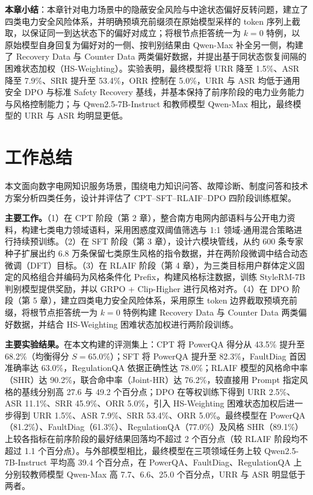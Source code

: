 \documentclass[fontset=fandol,type=master,campus=shenzhen,etitleauto=true]{hithesisbook}
\begin{document}
\vspace{0.5cm}
\noindent \textbf{本章小结}：本章针对电力场景中的隐蔽安全风险与中途状态偏好反转问题，建立了四类电力安全风险体系，并明确预填充前缀须在原始模型采样的 token 序列上截取，以保证同一到达状态下的偏好对成立；将根节点拒答统一为 $k = 0$ 特例，以原始模型自身回复为偏好对的一侧、按判别结果由 Qwen-Max 补全另一侧，构建了 Recovery Data 与 Counter Data 两类偏好数据，并提出基于同状态恢复间隔的困难状态加权（HS-Weighting）。实验表明，最终模型将 URR 降至 1.5\%、ASR 降至 7.9\%、SRR 提升至 53.4\%，ORR 控制在 5.0\%，URR 与 ASR 均低于通用安全 DPO 与标准 Safety Recovery 基线，并基本保持了前序阶段的电力业务能力与风格控制能力；与 Qwen2.5-7B-Instruct 和教师模型 Qwen-Max 相比，最终模型的 URR 与 ASR 均明显更低。

\backmatter
\begin{conclusions}
\label{ux603bux7ed3ux4e0eux5c55ux671b}

\section*{工作总结}\label{ux5de5ux4f5cux603bux7ed3}

本文面向数字电网知识服务场景，围绕电力知识问答、故障诊断、制度问答和技术方案分析四类任务，设计并评估了 CPT--SFT--RLAIF--DPO 四阶段训练框架。

\textbf{主要工作。}（1）在 CPT 阶段（第 2 章），整合南方电网内部语料与公开电力资料，构建七类电力领域语料，采用困惑度双阈值筛选与 1:1 领域-通用混合策略进行持续预训练。（2）在 SFT 阶段（第 3 章），设计六模块管线，从约 600 条专家种子扩展出约 6.8 万条保留七类原生风格的指令数据，并在两阶段微调中结合动态微调（DFT）目标。（3）在 RLAIF 阶段（第 4 章），为三类目标用户群体定义固定的风格组合并编码为风格条件化 Prefix，构建风格标注数据，训练 StyleRM-7B 判别模型提供奖励，并以 GRPO + Clip-Higher 进行风格对齐。（4）在 DPO 阶段（第 5 章），建立四类电力安全风险体系，采用原生 token 边界截取预填充前缀，将根节点拒答统一为 $k=0$ 特例构建 Recovery Data 与 Counter Data 两类偏好数据，并结合 HS-Weighting 困难状态加权进行两阶段训练。

\textbf{主要实验结果。}在本文构建的评测集上：CPT 将 PowerQA 得分从 43.5\% 提升至 68.2\%（均衡得分 $S=65.0\%$）；SFT 将 PowerQA 提升至 82.3\%，FaultDiag 首因准确率达 63.0\%，RegulationQA 依据正确性达 78.0\%；RLAIF 模型的风格命中率（SHR）达 90.2\%，联合命中率（Joint-HR）达 76.2\%，较直接用 Prompt 指定风格的基线分别高 27.6 与 49.2 个百分点；DPO 在等权训练下得到 URR 2.5\%、ASR 11.1\%、SRR 45.9\%、ORR 5.0\%，引入 HS-Weighting 困难状态加权后进一步得到 URR 1.5\%、ASR 7.9\%、SRR 53.4\%、ORR 5.0\%。最终模型在 PowerQA（81.2\%）、FaultDiag（61.3\%）、RegulationQA（77.0\%）及风格 SHR（89.1\%）上较各指标在前序阶段的最好结果回落均不超过 2 个百分点（较 RLAIF 阶段均不超过 1.1 个百分点）。与外部模型相比，最终模型在三项领域任务上较 Qwen2.5-7B-Instruct 平均高 39.4 个百分点，在 PowerQA、FaultDiag、RegulationQA 上分别较教师模型 Qwen-Max 高 7.7、6.6、25.0 个百分点，URR 与 ASR 明显低于两者。


\end{conclusions}
\end{document}
